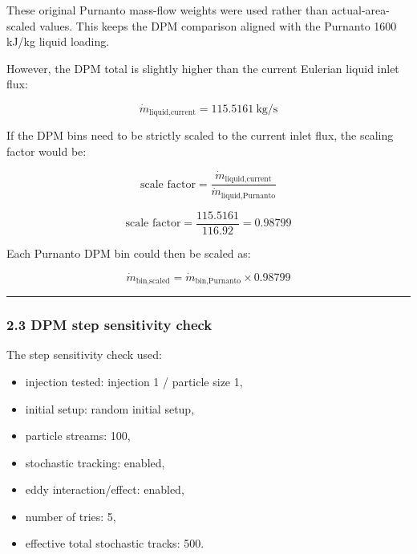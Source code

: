 \documentclass[
  11pt,
]{article}
\providecommand{\tightlist}{%
  \setlength{\itemsep}{0pt}\setlength{\parskip}{0pt}}
\begin{document}
These original Purnanto mass-flow weights were used rather than
actual-area-scaled values. This keeps the DPM comparison aligned with
the Purnanto 1600 kJ/kg liquid loading.

However, the DPM total is slightly higher than the current Eulerian
liquid inlet flux:

\[
\dot{m}_{\text{liquid,current}}
=
115.5161\ \text{kg/s}
\]

If the DPM bins need to be strictly scaled to the current inlet flux,
the scaling factor would be:

\[
\text{scale factor}
=
\frac{\dot{m}_{\text{liquid,current}}}
{\dot{m}_{\text{liquid,Purnanto}}}
\]

\[
\text{scale factor}
=
\frac{115.5161}{116.92}
=
0.98799
\]

Each Purnanto DPM bin could then be scaled as:

\[
\dot{m}_{\text{bin,scaled}}
=
\dot{m}_{\text{bin,Purnanto}}
\times 0.98799
\]

\begin{center}\rule{0.5\linewidth}{0.5pt}\end{center}

\subsubsection{2.3 DPM step sensitivity
check}\label{dpm-step-sensitivity-check}

The step sensitivity check used:

\begin{itemize}
\tightlist
\item
  injection tested: injection 1 / particle size 1,
\item
  initial setup: random initial setup,
\item
  particle streams: 100,
\item
  stochastic tracking: enabled,
\item
  eddy interaction/effect: enabled,
\item
  number of tries: 5,
\item
  effective total stochastic tracks: 500.
\end{itemize}
\end{document}
